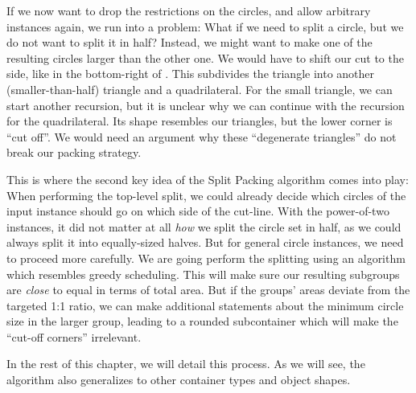 \documentclass[a4paper,style=print,bibliography=totoc,nexus,lnum,extramargin]{tubsbook}
\begin{document}

If we now want to drop the restrictions on the circles, and allow arbitrary instances again, we run into a problem: What if we need to split a circle, but we do not want to split it in half? Instead, we might want to make one of the resulting circles larger than the other one. We would have to shift our cut to the side, like in the bottom-right of . This subdivides the triangle into another (smaller-than-half) triangle and a quadrilateral. For the small triangle, we can start another recursion, but it is unclear why we can continue with the recursion for the quadrilateral. Its shape resembles our triangles, but the lower corner is “cut off”. We would need an argument why these “degenerate triangles” do not break our packing strategy.

This is where the second key idea of the Split Packing algorithm comes into play:
When performing the top-level split, we could already decide which circles of the input instance should go on which side of the cut-line. With the power-of-two instances, it did not matter at all \emph{how} we split the circle set in half, as we could always split it into equally-sized halves.
But for general circle instances, we need to proceed more carefully. We are going perform the splitting using an algorithm which resembles greedy scheduling. This will make sure our resulting subgroups are \emph{close} to equal in terms of total area. But if the groups' areas deviate from the targeted 1:1 ratio, we can make additional statements about the minimum circle size in the larger group, leading to a rounded subcontainer which will make the “cut-off corners” irrelevant.

In the rest of this chapter, we will detail this process. As we will see, the algorithm also generalizes to other container types and object shapes.



\end{document}
